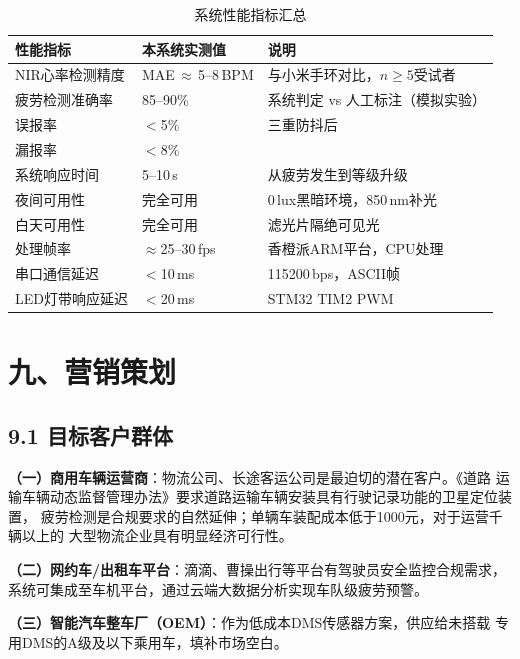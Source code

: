 \documentclass[a4paper,12pt]{article}
\begin{document}
\begin{table}[H]
  \centering
  \caption{系统性能指标汇总}
  \renewcommand{\arraystretch}{1.3}
  \begin{tabular}{|p{4cm}|p{4cm}|p{5.5cm}|}
    \hline
    \textbf{性能指标} & \textbf{本系统实测值} & \textbf{说明}\\
    \hline
    NIR心率检测精度 & MAE\,$\approx$\,5--8\,BPM & 与小米手环对比，$n\geq5$受试者\\
    \hline
    疲劳检测准确率 & 85--90\% & 系统判定 vs 人工标注（模拟实验）\\
    \hline
    误报率 & $<$5\% & 三重防抖后\\
    \hline
    漏报率 & $<$8\% & \\
    \hline
    系统响应时间 & 5--10\,s & 从疲劳发生到等级升级\\
    \hline
    夜间可用性 & 完全可用 & 0\,lux黑暗环境，850\,nm补光\\
    \hline
    白天可用性 & 完全可用 & 滤光片隔绝可见光\\
    \hline
    处理帧率 & $\approx$25--30\,fps & 香橙派ARM平台，CPU处理\\
    \hline
    串口通信延迟 & $<$10\,ms & 115200\,bps，ASCII帧\\
    \hline
    LED灯带响应延迟 & $<$20\,ms & STM32 TIM2 PWM\\
    \hline
  \end{tabular}
\end{table}

\section*{九、营销策划}

\subsection*{9.1 目标客户群体}

\textbf{（一）商用车辆运营商}：物流公司、长途客运公司是最迫切的潜在客户。《道路
运输车辆动态监督管理办法》要求道路运输车辆安装具有行驶记录功能的卫星定位装置，
疲劳检测是合规要求的自然延伸；单辆车装配成本低于1000元，对于运营千辆以上的
大型物流企业具有明显经济可行性。

\textbf{（二）网约车/出租车平台}：滴滴、曹操出行等平台有驾驶员安全监控合规需求，
系统可集成至车机平台，通过云端大数据分析实现车队级疲劳预警。

\textbf{（三）智能汽车整车厂（OEM）}：作为低成本DMS传感器方案，供应给未搭载
专用DMS的A级及以下乘用车，填补市场空白。
\end{document}
